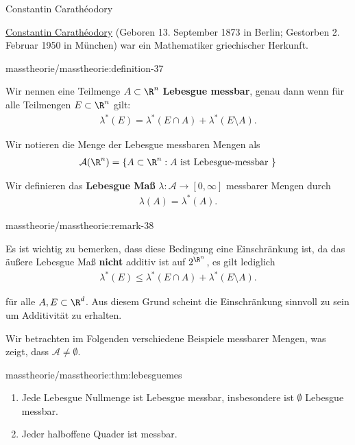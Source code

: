 \documentclass[letterpaper,10pt,german]{jupyterBook}
\begin{document}
\begin{emphBox}{Constantin Carathéodory}{}

\par
\href{https://de.wikipedia.org/wiki/Constantin\_Carath\%C3\%A9odory}{Constantin Carathéodory} (Geboren 13. September 1873 in Berlin; Gestorben 2. Februar 1950 in München) war ein Mathematiker griechischer Herkunft.
\end{emphBox}
\begin{definition}{}{masstheorie/masstheorie:definition-37}



\par
Wir nennen eine Teilmenge \(A \subset \R^n\) \textbf{Lebesgue messbar}, genau dann wenn für alle Teilmengen \(E \subset \R^n\) gilt:
\begin{align*}
\lambda^*(E) = \lambda^*(E \cap A) + \lambda^*(E \setminus A).
\end{align*}
\par
Wir notieren die Menge der Lebesgue messbaren Mengen als
\begin{align*}
\mathcal{A}(\R^n) = \lbrace A \subset \R^n : A \text{ ist Lebesgue-messbar } \rbrace
\end{align*}
\par
Wir definieren das \textbf{Lebesgue Maß} \(\lambda \colon \mathcal{A} \rightarrow [0,\infty]\) messbarer Mengen durch
\begin{align*}
\lambda(A) = \lambda^*(A).
\end{align*}\end{definition}
\begin{remark}{}{masstheorie/masstheorie:remark-38}



\par
Es ist wichtig zu bemerken, dass diese Bedingung eine Einschränkung ist, da das äußere Lebesgue Maß \textbf{nicht} additiv ist auf \(2^{\R^n}\), es gilt lediglich
\begin{align*}
\lambda^*(E) \leq \lambda^*(E \cap A) + \lambda^*(E \setminus A).
\end{align*}
\par
für alle \(A,E\subset\R^d\). Aus diesem Grund scheint die Einschränkung sinnvoll zu sein um Additivität zu erhalten.
\end{remark}

\par
Wir betrachten im Folgenden verschiedene Beispiele messbarer Mengen, was zeigt, dass \(\mathcal{A}\neq \emptyset\).
\begin{lemma}{}{masstheorie/masstheorie:thm:lebesguemes}


\begin{enumerate}

\item {} 
\par
Jede Lebesgue Nullmenge ist Lebesgue messbar, insbesondere ist \(\emptyset\) Lebesgue messbar.

\item {} 
\par
Jeder halboffene Quader ist messbar.

\end{enumerate}
\end{lemma}
\end{document}
